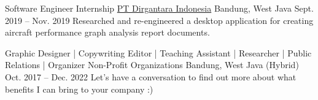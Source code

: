 \begin{cventries}

\cventry
{Software Engineer Internship} %
{\href{https://www.indonesian-aerospace.com/}{PT Dirgantara Indonesia}} %
{Bandung, West Java} %
{Sept. 2019 -- Nov. 2019} %
{ %
Researched and re-engineered a desktop application for creating aircraft performance graph analysis report documents.
}


\cventry
{Graphic Designer | Copywriting Editor | Teaching Assistant | Researcher | Public Relations | Organizer} %
{Non-Profit Organizations} %
{Bandung, West Java (Hybrid)} %
{Oct. 2017 -- Dec. 2022} %
{ %
Let's have a conversation to find out more about what benefits I can bring to your company :)
}






\end{cventries}
